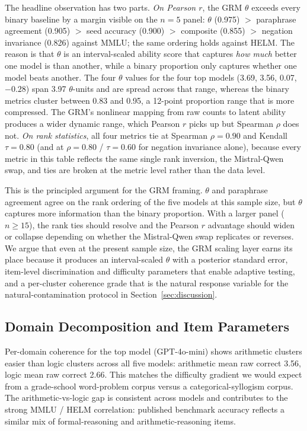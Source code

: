 \documentclass[11pt,letterpaper]{article}
\begin{document}
The headline observation has two parts. \emph{On Pearson $r$}, the GRM $\theta$ exceeds every binary baseline by a margin visible on the $n = 5$ panel: $\theta$ (0.975) $>$ paraphrase agreement (0.905) $>$ seed accuracy (0.900) $>$ composite (0.855) $>$ negation invariance (0.826) against MMLU; the same ordering holds against HELM. The reason is that $\theta$ is an interval-scaled ability score that captures \emph{how much} better one model is than another, while a binary proportion only captures whether one model beats another. The four $\theta$ values for the four top models (3.69, 3.56, 0.07, $-0.28$) span 3.97 $\theta$-units and are spread across that range, whereas the binary metrics cluster between 0.83 and 0.95, a 12-point proportion range that is more compressed. The GRM's nonlinear mapping from raw counts to latent ability produces a wider dynamic range, which Pearson $r$ picks up but Spearman $\rho$ does not. \emph{On rank statistics}, all four metrics tie at Spearman $\rho = 0.90$ and Kendall $\tau = 0.80$ (and at $\rho = 0.80$ / $\tau = 0.60$ for negation invariance alone), because every metric in this table reflects the same single rank inversion, the Mistral-Qwen swap, and ties are broken at the metric level rather than the data level.

This is the principled argument for the GRM framing. $\theta$ and paraphrase agreement agree on the rank ordering of the five models at this sample size, but $\theta$ captures more information than the binary proportion. With a larger panel ($n \geq 15$), the rank ties should resolve and the Pearson $r$ advantage should widen or collapse depending on whether the Mistral-Qwen swap replicates or reverses. We argue that even at the present sample size, the GRM scaling layer earns its place because it produces an interval-scaled $\theta$ with a posterior standard error, item-level discrimination and difficulty parameters that enable adaptive testing, and a per-cluster coherence grade that is the natural response variable for the natural-contamination protocol in Section~\ref{sec:discussion}.

\subsection{Domain Decomposition and Item Parameters}

Per-domain coherence for the top model (GPT-4o-mini) shows arithmetic clusters easier than logic clusters across all five models: arithmetic mean raw correct 3.56, logic mean raw correct 2.66. This matches the difficulty gradient we would expect from a grade-school word-problem corpus versus a categorical-syllogism corpus. The arithmetic-vs-logic gap is consistent across models and contributes to the strong MMLU / HELM correlation: published benchmark accuracy reflects a similar mix of formal-reasoning and arithmetic-reasoning items.
\end{document}
